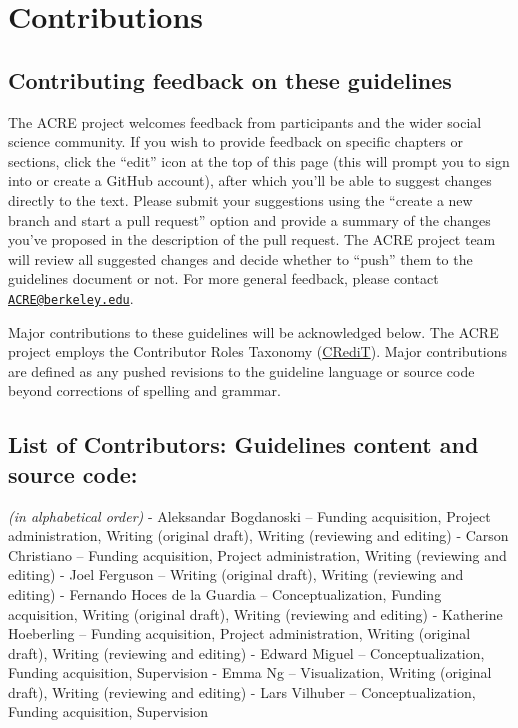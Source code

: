 \documentclass[]{book}
\begin{document}
\hypertarget{contributions}{%
\chapter{Contributions}\label{contributions}}

\hypertarget{contributing-feedback-on-these-guidelines}{%
\section{Contributing feedback on these guidelines}\label{contributing-feedback-on-these-guidelines}}

The ACRE project welcomes feedback from participants and the wider social science community. If you wish to provide feedback on specific chapters or sections, click the ``edit'' icon at the top of this page (this will prompt you to sign into or create a GitHub account), after which you'll be able to suggest changes directly to the text. Please submit your suggestions using the ``create a new branch and start a pull request'' option and provide a summary of the changes you've proposed in the description of the pull request. The ACRE project team will review all suggested changes and decide whether to ``push'' them to the guidelines document or not. For more general feedback, please contact \href{mailto:ACRE@berkeley.edu}{\nolinkurl{ACRE@berkeley.edu}}.

Major contributions to these guidelines will be acknowledged below. The ACRE project employs the Contributor Roles Taxonomy (\href{https://casrai.org/credit/}{CRediT}). Major contributions are defined as any pushed revisions to the guideline language or source code beyond corrections of spelling and grammar.

\hypertarget{list-of-contributors-guidelines-content-and-source-code}{%
\section{List of Contributors: Guidelines content and source code:}\label{list-of-contributors-guidelines-content-and-source-code}}

\emph{(in alphabetical order)}
- Aleksandar Bogdanoski -- Funding acquisition, Project administration, Writing (original draft), Writing (reviewing and editing)
- Carson Christiano -- Funding acquisition, Project administration, Writing (reviewing and editing)
- Joel Ferguson -- Writing (original draft), Writing (reviewing and editing)
- Fernando Hoces de la Guardia -- Conceptualization, Funding acquisition, Writing (original draft), Writing (reviewing and editing)
- Katherine Hoeberling -- Funding acquisition, Project administration, Writing (original draft), Writing (reviewing and editing)
- Edward Miguel -- Conceptualization, Funding acquisition, Supervision
- Emma Ng -- Visualization, Writing (original draft), Writing (reviewing and editing)
- Lars Vilhuber -- Conceptualization, Funding acquisition, Supervision
\end{document}
